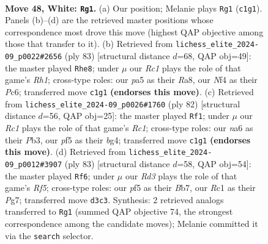 \documentclass[11pt]{article}
\begin{document}
\clearpage

\begin{figure}[p]\centering
\begin{subfigure}{0.46\textwidth}\centering
\resizebox{\linewidth}{!}{%
\newchessgame
\chessboard[
  setfen={r2b4/1p1k3p/n5pP/p4p2/P2BrN2/3R2P1/8/2R4K w - - 3 48},
  showmover=false,
  pgfstyle=straightmove, color=movearrow, markmove={c1-g1}
]}
\caption{}
\end{subfigure}\hfill
\begin{subfigure}{0.46\textwidth}\centering
\resizebox{\linewidth}{!}{%
\newchessgame
\chessboard[
  setfen={r6r/1p3k2/1BpRbp2/P7/2P1P3/4KP2/8/1R6 b - - 0 42},
  showmover=false,
  pgfstyle=straightmove, color=movearrow, markmove={h8-e8}
]}
\caption{}
\end{subfigure}
\\[4pt]
\begin{subfigure}{0.46\textwidth}\centering
\resizebox{\linewidth}{!}{%
\newchessgame
\chessboard[
  setfen={5b2/pk6/2p3p1/PpB1P2p/4NrbP/1P6/8/2R3K1 w - - 0 42},
  showmover=false,
  pgfstyle=straightmove, color=movearrow, markmove={c1-f1}
]}
\caption{}
\end{subfigure}\hfill
\begin{subfigure}{0.46\textwidth}\centering
\resizebox{\linewidth}{!}{%
\newchessgame
\chessboard[
  setfen={8/1b3kp1/1p5p/p2p4/3Nnr2/P1PBR2P/1P4P1/6K1 b - - 6 42},
  showmover=false,
  pgfstyle=straightmove, color=movearrow, markmove={f4-f6}
]}
\caption{}
\end{subfigure}
\caption{\textbf{Move 48, White: \texttt{Rg1}.} (a) Our position; Melanie plays \texttt{Rg1} (\texttt{c1g1}). Panels (b)--(d) are the retrieved master positions whose correspondence most drove this move (highest QAP objective among those that transfer to it). (b) Retrieved from \texttt{lichess\_elite\_2024-09\_p0022\#2656} (ply 83) [structural distance $d$=68, QAP obj=49]: the master played \texttt{Rhe8}; under $\mu$ our \emph{Rc1} plays the role of that game's \emph{Rh1}; cross-type roles: our \emph{p}a5 as their \emph{R}a8, our \emph{N}f4 as their \emph{P}c6; transferred move \texttt{c1g1} \textbf{(endorses this move)}. (c) Retrieved from \texttt{lichess\_elite\_2024-09\_p0026\#1760} (ply 82) [structural distance $d$=56, QAP obj=25]: the master played \texttt{Rf1}; under $\mu$ our \emph{Rc1} plays the role of that game's \emph{Rc1}; cross-type roles: our \emph{n}a6 as their \emph{P}b3, our \emph{p}f5 as their \emph{b}g4; transferred move \texttt{c1g1} \textbf{(endorses this move)}. (d) Retrieved from \texttt{lichess\_elite\_2024-09\_p0012\#3907} (ply 83) [structural distance $d$=58, QAP obj=54]: the master played \texttt{Rf6}; under $\mu$ our \emph{Rd3} plays the role of that game's \emph{Rf5}; cross-type roles: our \emph{p}f5 as their \emph{B}b7, our \emph{R}c1 as their \emph{P}g7; transferred move \texttt{d3c3}. Synthesis: 2 retrieved analogs transferred to \texttt{Rg1} (summed QAP objective 74, the strongest correspondence among the candidate moves); Melanie committed it via the \texttt{search} selector.}
\label{fig:thought-m94}
\end{figure}
\end{document}
